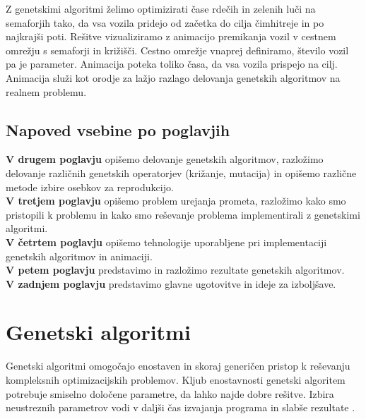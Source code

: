 \documentclass[a4paper, 12pt]{book}
\begin{document}
Z genetskimi algoritmi \v zelimo optimizirati \v case rde\v cih in zelenih lu\v ci na semaforjih tako, da vsa vozila pridejo od za\v cetka do cilja \v cimhitreje in po najkraj\v si poti. Re\v sitve vizualiziramo z animacijo premikanja vozil v cestnem omre\v zju s semaforji in kri\v zi\v s\v ci. Cestno omre\v zje vnaprej definiramo, \v stevilo vozil pa je parameter. Animacija poteka toliko \v casa, da vsa  vozila prispejo na cilj. Animacija slu\v zi kot orodje za la\v zjo razlago delovanja genetskih algoritmov na realnem problemu.

\section{Napoved vsebine po poglavjih}
\textbf{V drugem poglavju} opi\v semo delovanje genetskih algoritmov, razlo\v zimo delovanje razli\v cnih genetskih operatorjev (kri\v zanje, mutacija) in opi\v semo razli\v cne metode izbire osebkov za reprodukcijo.\\
\textbf{V tretjem poglavju} opi\v semo problem urejanja prometa, razlo\v zimo kako smo pristopili k problemu in kako smo re\v sevanje problema implementirali z genetskimi algoritmi.\\
\textbf{V \v cetrtem poglavju} opi\v semo tehnologije uporabljene pri implementaciji genetskih algoritmov in animaciji.\\
\textbf{V petem poglavju} predstavimo in razlo\v zimo rezultate genetskih algoritmov.\\
\textbf{V zadnjem poglavju} predstavimo glavne ugotovitve in ideje za izbolj\v save.

\chapter{Genetski algoritmi}
\label{ch1}
Genetski algoritmi omogo\v cajo enostaven in skoraj generi\v cen pristop k re\v sevanju kompleksnih optimizacijskih problemov. Kljub enostavnosti genetski algoritem potrebuje smiselno dolo\v cene parametre, da lahko najde dobre re\v sitve. Izbira neustreznih parametrov vodi v dalj\v si \v cas izvajanja programa in slab\v se rezultate
\cite{sarmady}.
\end{document}
